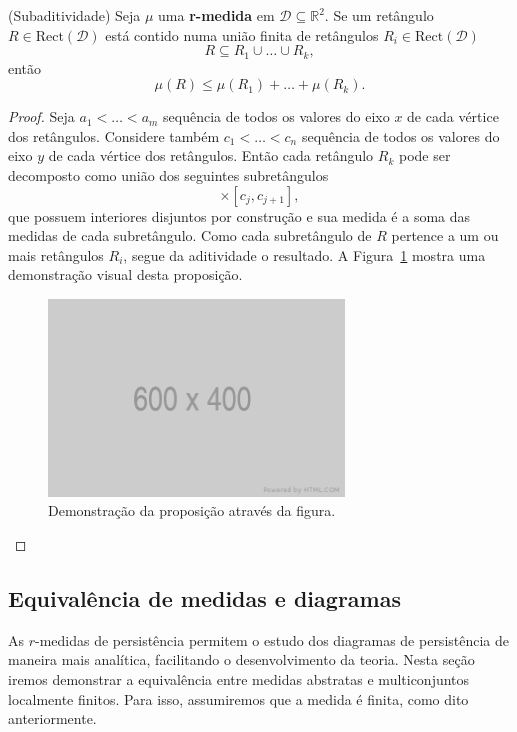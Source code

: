 \begin{propo}{(Subaditividade)} 
    Seja $\mu$ uma \textbf{r-medida} em $\mathcal{D} \subseteq \mathbb{R}^2$. Se um retângulo $R \in 
    \text{Rect}(\mathcal{D})$ está contido numa união finita de retângulos $R_i \in \text{Rect}(
    \mathcal{D})$
    \begin{equation*}
        R \subseteq R_1 \cup \dots \cup R_k,
    \end{equation*}
    então
    \begin{equation*}
        \mu(R) \leq \mu(R_1) + \dots + \mu(R_k).
    \end{equation*}
\end{propo}
\begin{proof}
    Seja $a_1 < \dots < a_m$ sequência de todos os valores do eixo $x$ de cada vértice dos retângulos. 
    Considere também $c_1 < \dots < c_n$ sequência de todos os valores do eixo $y$ de cada vértice dos retângulos.
    Então cada retângulo $R_k$ pode ser decomposto como união dos seguintes subretângulos
    \begin{equation*}
        [a_i, a_{i+1}] \times [c_j, c_{j+1}],
    \end{equation*}
    que possuem interiores disjuntos por construção e sua medida é a soma das medidas de cada subretângulo. 
    Como cada subretângulo de $R$ pertence a um ou mais retângulos $R_i$, segue da aditividade o resultado.
    A Figura~\ref{fig:dem_subadd} mostra uma demonstração visual desta proposição. 
    \begin{figure}[htpb!]
        \centering
        \includegraphics[width=0.7\textwidth]{images/placeholder.png}
        \caption{Demonstração da proposição através da figura.}
        \label{fig:dem_subadd}
        \fautor
    \end{figure}
\end{proof}

\subsection{Equivalência de medidas e diagramas}
As $r$-medidas de persistência permitem o estudo dos diagramas de persistência de maneira mais analítica,
facilitando o desenvolvimento da teoria. Nesta seção iremos demonstrar a equivalência entre medidas 
abstratas e multiconjuntos localmente finitos. Para isso, assumiremos que a medida é finita, como dito
anteriormente. 

